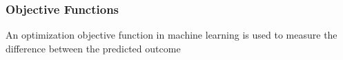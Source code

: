 \subsubsection{Objective Functions}
An optimization objective function in machine learning is used to measure the difference between the predicted outcome